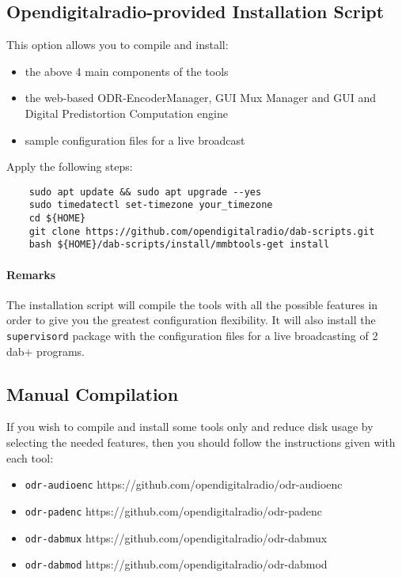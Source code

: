 \subsection{Opendigitalradio-provided Installation Script}
This option allows you to compile and install:
\begin{itemize}
    \item the above 4 main components of the tools

    \item the web-based ODR-EncoderManager, GUI Mux Manager and GUI and Digital
        Predistortion Computation engine
    \item sample configuration files for a live broadcast
\end{itemize}

Apply the following steps:
\begin{lstlisting}
    sudo apt update && sudo apt upgrade --yes
    sudo timedatectl set-timezone your_timezone
    cd ${HOME}
    git clone https://github.com/opendigitalradio/dab-scripts.git
    bash ${HOME}/dab-scripts/install/mmbtools-get install
\end{lstlisting}

\paragraph{Remarks}
The installation script will compile the tools with all the possible features
in order to give you the greatest configuration flexibility. It will also
install the \texttt{supervisord} package with the configuration files for
a live broadcasting of 2 dab+ programs.

\subsection{Manual Compilation}
If you wish to compile and install some tools only and reduce disk usage by
selecting the needed features, then you should follow the instructions given
with each tool:

\begin{itemize}
    \item \texttt{odr-audioenc} https://github.com/opendigitalradio/odr-audioenc
    \item \texttt{odr-padenc} https://github.com/opendigitalradio/odr-padenc
    \item \texttt{odr-dabmux} https://github.com/opendigitalradio/odr-dabmux
    \item \texttt{odr-dabmod} https://github.com/opendigitalradio/odr-dabmod
\end{itemize}

